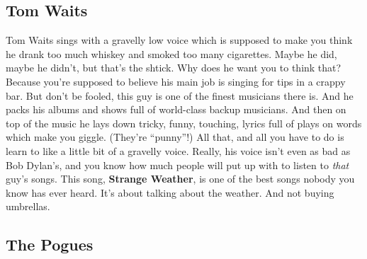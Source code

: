 \documentclass[letterpaper,]{article}
\begin{document}
\hypertarget{tom-waits}{%
\subsection{Tom Waits}\label{tom-waits}}

Tom Waits sings with a gravelly low voice which is supposed to make you
think he drank too much whiskey and smoked too many cigarettes. Maybe he
did, maybe he didn't, but that's the shtick. Why does he want you to
think that? Because you're supposed to believe his main job is singing
for tips in a crappy bar. But don't be fooled, this guy is one of the
finest musicians there is. And he packs his albums and shows full of
world-class backup musicians. And then on top of the music he lays down
tricky, funny, touching, lyrics full of plays on words which make you
giggle. (They're ``punny''!) All that, and all you have to do is learn
to like a little bit of a gravelly voice. Really, his voice isn't even
as bad as Bob Dylan's, and you know how much people will put up with to
listen to \emph{that} guy's songs. This song, \textbf{Strange Weather},
is one of the best songs nobody you know has ever heard. It's about
talking about the weather. And not buying umbrellas.

\hypertarget{the-pogues}{%
\subsection{The Pogues}\label{the-pogues}}
\end{document}
